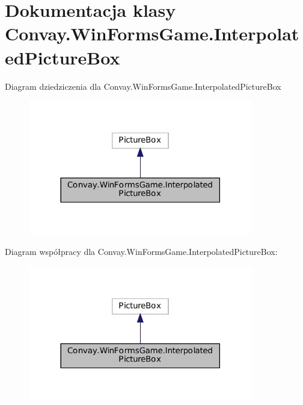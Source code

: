 \hypertarget{class_convay_1_1_win_forms_game_1_1_interpolated_picture_box}{}\section{Dokumentacja klasy Convay.\+Win\+Forms\+Game.\+Interpolated\+Picture\+Box}
\label{class_convay_1_1_win_forms_game_1_1_interpolated_picture_box}


Diagram dziedziczenia dla Convay.\+Win\+Forms\+Game.\+Interpolated\+Picture\+Box
\nopagebreak
\begin{figure}[H]
\begin{center}
\leavevmode
\includegraphics[width=278pt]{class_convay_1_1_win_forms_game_1_1_interpolated_picture_box__inherit__graph}
\end{center}
\end{figure}


Diagram współpracy dla Convay.\+Win\+Forms\+Game.\+Interpolated\+Picture\+Box\+:
\nopagebreak
\begin{figure}[H]
\begin{center}
\leavevmode
\includegraphics[width=278pt]{class_convay_1_1_win_forms_game_1_1_interpolated_picture_box__coll__graph}
\end{center}
\end{figure}
